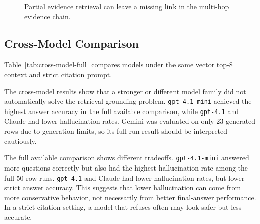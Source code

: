 \documentclass[10pt,twocolumn]{article}
\begin{document}
\begin{figure}[t]
\centering
{}
\caption{Partial evidence retrieval can leave a missing link in the multi-hop evidence chain.}
\label{fig:evidence-gap}
\end{figure}

\subsection{Cross-Model Comparison}

Table~\ref{tab:cross-model-full} compares models under the same vector top-8 context and strict citation prompt.

The cross-model results show that a stronger or different model family did not automatically solve the retrieval-grounding problem. \texttt{gpt-4.1-mini} achieved the highest answer accuracy in the full available comparison, while \texttt{gpt-4.1} and Claude had lower hallucination rates. Gemini was evaluated on only 23 generated rows due to generation limits, so its full-run result should be interpreted cautiously.

The full available comparison shows different tradeoffs. \texttt{gpt-4.1-mini} answered more questions correctly but also had the highest hallucination rate among the full 50-row runs. \texttt{gpt-4.1} and Claude had lower hallucination rates, but lower strict answer accuracy. This suggests that lower hallucination can come from more conservative behavior, not necessarily from better final-answer performance. In a strict citation setting, a model that refuses often may look safer but less accurate.
\end{document}
